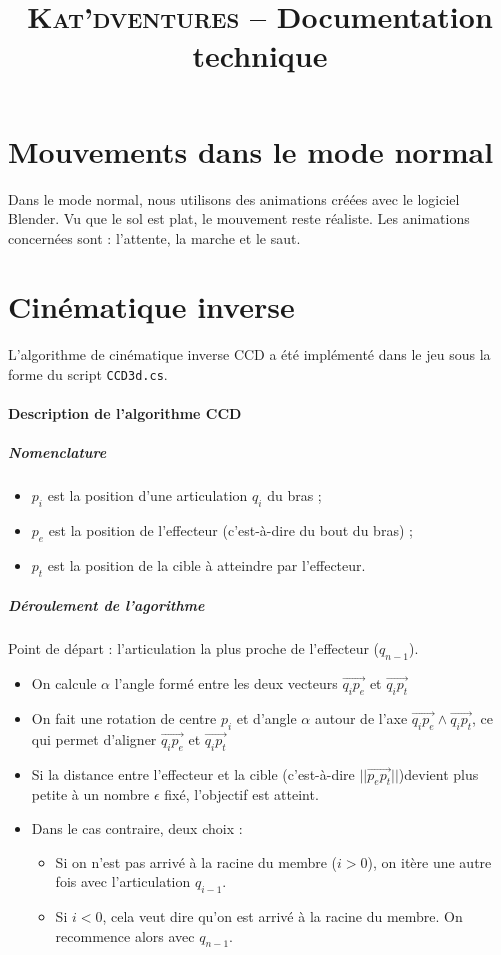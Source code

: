 \documentclass[a4paper,11pt]{article}
\title{ \textsc{Kat'dventures} -- Documentation technique }
\date{}                    %
\begin{document}
          

\maketitle                 %
\thispagestyle{empty}      %

\section{Mouvements dans le mode normal}
Dans le mode normal, nous utilisons des animations créées avec le logiciel Blender. Vu que le sol est plat, le mouvement reste réaliste. Les animations concernées sont : l’attente, la marche et le saut. 

\section{Cinématique inverse}
L’algorithme de cinématique inverse CCD a été implémenté dans le jeu sous la forme du script \texttt{CCD3d.cs}.
\paragraph{Description de l'algorithme CCD} 
\subparagraph{Nomenclature}
\begin{itemize}
\item $p_i$ est la position d'une articulation $q_i$ du bras ;
\item $p_e$ est la position de l'effecteur (c'est-à-dire du bout du bras) ;
\item $p_t$ est la position de la cible à atteindre par l'effecteur. 
\end{itemize} 

\subparagraph{Déroulement de l'agorithme}
Point de départ : l'articulation la plus proche de l'effecteur ($q_{n-1}$).

\begin{itemize}
\item On calcule $\alpha$ l'angle formé entre les deux vecteurs $\vec{q_i p_e}$ et $\vec{q_i p_t}$
\item On fait une rotation de centre $p_i$ et d'angle $\alpha$ autour de l'axe $\vec{q_i p_e}\land\vec{q_i p_t}$, ce qui permet d'aligner $\vec{q_i p_e}$ et $\vec{q_i p_t}$
\item Si la distance entre l'effecteur et la cible (c'est-à-dire $||\vec{p_e p_t}||$)devient plus petite à un nombre $\epsilon$ fixé, l'objectif est atteint. 
\item Dans le cas contraire, deux choix : 
\begin{itemize}
\item Si on n'est pas arrivé à la racine du membre ($i>0$), on itère une autre fois avec l'articulation $q_{i-1}$.
\item Si $i<0$, cela veut dire qu'on est arrivé à la racine du membre. On recommence alors avec $q_{n-1}$.
\end{itemize}
\end{itemize}
\end{document}
